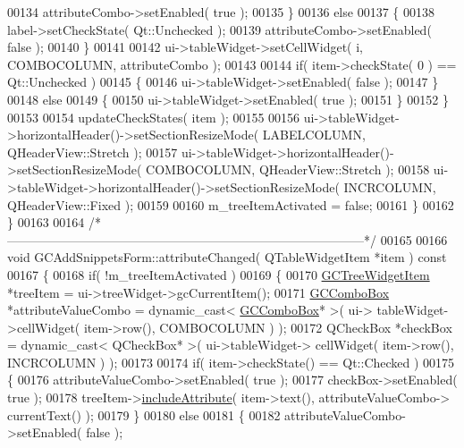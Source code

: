 \begin{DoxyCode}
00134         attributeCombo->setEnabled( \textcolor{keyword}{true} );
00135       \}
00136       \textcolor{keywordflow}{else}
00137       \{
00138         label->setCheckState( Qt::Unchecked );
00139         attributeCombo->setEnabled( \textcolor{keyword}{false} );
00140       \}
00141 
00142       ui->tableWidget->setCellWidget( i, COMBOCOLUMN, attributeCombo );
00143 
00144       \textcolor{keywordflow}{if}( item->checkState( 0 ) == Qt::Unchecked )
00145       \{
00146         ui->tableWidget->setEnabled( \textcolor{keyword}{false} );
00147       \}
00148       \textcolor{keywordflow}{else}
00149       \{
00150         ui->tableWidget->setEnabled( \textcolor{keyword}{true} );
00151       \}
00152     \}
00153 
00154     updateCheckStates( item );
00155 
00156     ui->tableWidget->horizontalHeader()->setSectionResizeMode( LABELCOLUMN, 
      QHeaderView::Stretch );
00157     ui->tableWidget->horizontalHeader()->setSectionResizeMode( COMBOCOLUMN, 
      QHeaderView::Stretch );
00158     ui->tableWidget->horizontalHeader()->setSectionResizeMode( INCRCOLUMN,  
      QHeaderView::Fixed );
00159 
00160     m\_treeItemActivated = \textcolor{keyword}{false};
00161   \}
00162 \}
00163 
00164 \textcolor{comment}{/*
      --------------------------------------------------------------------------------------*/}
00165 
00166 \textcolor{keywordtype}{void} GCAddSnippetsForm::attributeChanged( QTableWidgetItem *item )\textcolor{keyword}{ const}
00167 \textcolor{keyword}{}\{
00168   \textcolor{keywordflow}{if}( !m\_treeItemActivated )
00169   \{
00170     \hyperlink{class_g_c_tree_widget_item}{GCTreeWidgetItem} *treeItem = ui->treeWidget->gcCurrentItem();
00171     \hyperlink{class_g_c_combo_box}{GCComboBox} *attributeValueCombo = \textcolor{keyword}{dynamic\_cast<} \hyperlink{class_g_c_combo_box}{GCComboBox}* \textcolor{keyword}{>}( ui->
      tableWidget->cellWidget( item->row(), COMBOCOLUMN ) );
00172     QCheckBox *checkBox = \textcolor{keyword}{dynamic\_cast<} QCheckBox* \textcolor{keyword}{>}( ui->tableWidget->
      cellWidget( item->row(), INCRCOLUMN ) );
00173 
00174     \textcolor{keywordflow}{if}( item->checkState() == Qt::Checked )
00175     \{
00176       attributeValueCombo->setEnabled( \textcolor{keyword}{true} );
00177       checkBox->setEnabled( \textcolor{keyword}{true} );
00178       treeItem->\hyperlink{class_g_c_tree_widget_item_a3f1c09758031e2a8fc1ac9336697b3d9}{includeAttribute}( item->text(), attributeValueCombo->
      currentText() );
00179     \}
00180     \textcolor{keywordflow}{else}
00181     \{
00182       attributeValueCombo->setEnabled( \textcolor{keyword}{false} );

\end{DoxyCode}
